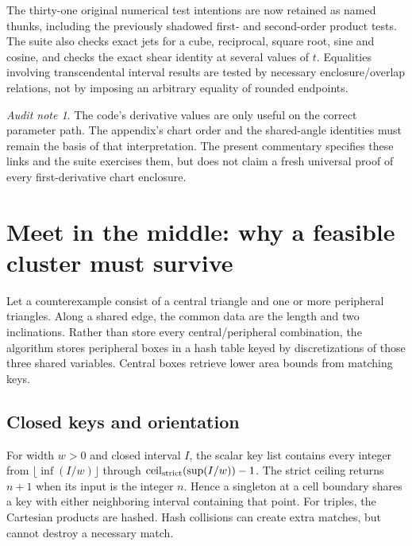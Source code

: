 \documentclass[11pt,a4paper]{article}
\newcommand{\code}[1]{\texttt{\detokenize{#1}}}
\theoremstyle{remark}\newtheorem*{contract}{Implementation contract}\newtheorem*{auditnote}{Audit note}
\begin{document}
The thirty-one original numerical test intentions are now retained as named
thunks, including the previously shadowed first- and second-order product
tests. The suite also checks exact jets for a cube, reciprocal, square root,
sine and cosine, and checks the exact shear identity at several values of
$t$. Equalities involving transcendental interval results are tested by
necessary enclosure/overlap relations, not by imposing an arbitrary equality
of rounded endpoints.

\begin{auditnote}
The code's derivative values are only useful on the correct parameter path.
The appendix's chart order and the shared-angle identities must remain the
basis of that interpretation. The present commentary specifies these links
and the suite exercises them, but does not claim a fresh universal proof of
every first-derivative chart enclosure.
\end{auditnote}

\section{Meet in the middle: why a feasible cluster must survive}

Let a counterexample consist of a central triangle and one or more peripheral
triangles. Along a shared edge, the common data are the length and two
inclinations. Rather than store every central/peripheral combination, the
algorithm stores peripheral boxes in a hash table keyed by discretizations
of those three shared variables. Central boxes retrieve lower area bounds
from matching keys.

\subsection{Closed keys and orientation}
For width $w>0$ and closed interval $I$, the scalar key list contains every
integer from $\lfloor\inf(I/w)\rfloor$ through
$\operatorname{ceil}_{\rm strict}(\sup(I/w))-1$. The strict ceiling
returns $n+1$ when its input is the integer $n$. Hence a singleton at a cell
boundary shares a key with either neighboring interval containing that point.
For triples, the Cartesian products are hashed. Hash collisions can create
extra matches, but cannot destroy a necessary match.


\end{document}
